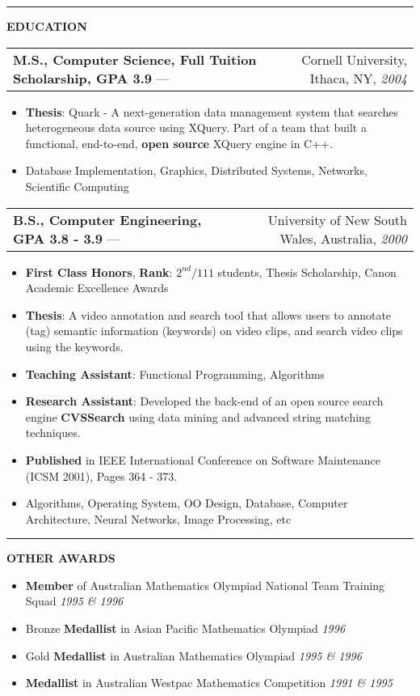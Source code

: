 \documentclass[11pt]{article}
\makeatletter
\newcommand{\resheading}[1]{\vspace{1pt}\textbf{#1}}
\newcommand{\ressubheading}[4]{\vspace{6pt}
\begin{tabular*}{\textwidth}{@{}l@{\extracolsep{\fill}}r@{}}
\textbf{#1} --- & #3, #2, \textit{#4} \\
\end{tabular*}}
\newcommand{\resitem}[1]{\item #1}
\newcommand{\resawarditem}[2]{\item #1 \hfill \textit{#2}}
\newcommand{\ressep}{\vspace{6pt}\hrule\vspace{3pt}}
\makeatother
\begin{document}
\ressep{}
\resheading{EDUCATION}

\ressubheading{M.S., Computer Science, Full Tuition Scholarship, GPA 3.9}{Ithaca, NY}{Cornell University}{2004}
\begin{itemize}
\resitem{\textbf{Thesis}: Quark - A next-generation data management system that searches heterogeneous data source using XQuery. Part of a team that built a functional, end-to-end, \textbf{open source} XQuery engine in C++.}
\resitem{Database Implementation, Graphics, Distributed Systems, Networks, Scientific Computing}

\end{itemize}

\ressubheading{B.S., Computer Engineering, GPA 3.8 - 3.9}{Australia}{University of New South Wales}{2000}
\begin{itemize}
\resitem{\textbf{First Class Honors}, \textbf{Rank}: $2^{nd}/111$ students,
Thesis Scholarship, Canon Academic Excellence Awards}
\resitem{\textbf{Thesis}: A video annotation and search tool that allows users to annotate (tag) semantic information (keywords) on video clips, and search video clips using the keywords.}
\resitem{\textbf{Teaching Assistant}: Functional Programming, Algorithms}
\resitem{\textbf{Research Assistant}: Developed the back-end of an open source search engine \textbf{CVSSearch} using data mining and advanced string matching techniques.}
\resitem{\textbf{Published} in IEEE International Conference on Software Maintenance (ICSM 2001), Pages 364 - 373.}
\resitem{Algorithms, Operating System, OO Design, Database, Computer Architecture, Neural Networks, Image Processing, etc}
\end{itemize}

\ressep{}
\resheading{OTHER AWARDS}

\begin{itemize}
\resawarditem{\textbf{Member} of Australian Mathematics Olympiad National Team Training Squad}{1995 \& 1996}
\resawarditem{Bronze \textbf{Medallist} in Asian Pacific Mathematics Olympiad}{1996}
\resawarditem{Gold \textbf{Medallist} in Australian Mathematics Olympiad}{1995 \& 1996}
\resawarditem{\textbf{Medallist} in Australian Westpac Mathematics Competition}{1991 \& 1995}
\end{itemize}
\end{document}
